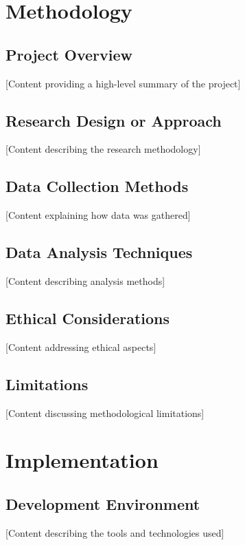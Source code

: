 \documentclass[11pt,a4paper]{article}
\begin{document}
\section{Methodology}

\subsection{Project Overview}
[Content providing a high-level summary of the project]

\subsection{Research Design or Approach}
[Content describing the research methodology]

\subsection{Data Collection Methods}
[Content explaining how data was gathered]

\subsection{Data Analysis Techniques}
[Content describing analysis methods]

\subsection{Ethical Considerations}
[Content addressing ethical aspects]

\subsection{Limitations}
[Content discussing methodological limitations]

\section{Implementation}

\subsection{Development Environment}
[Content describing the tools and technologies used]
\end{document}
